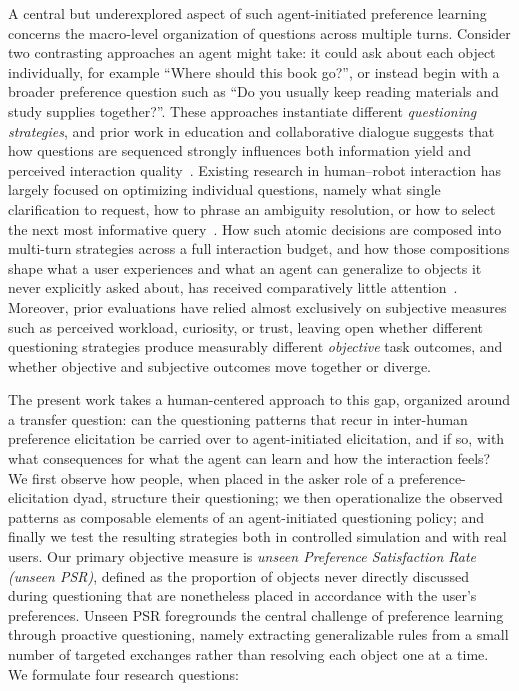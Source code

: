 \documentclass[manuscript,review,anonymous]{acmart}
\begin{document}
A central but underexplored aspect of such agent-initiated preference learning concerns the macro-level organization of questions across multiple turns. Consider two contrasting approaches an agent might take: it could ask about each object individually, for example ``Where should this book go?'', or instead begin with a broader preference question such as ``Do you usually keep reading materials and study supplies together?''. These approaches instantiate different \textit{questioning strategies}, and prior work in education and collaborative dialogue suggests that how questions are sequenced strongly influences both information yield and perceived interaction quality~\cite{cakmak2012designing,mutlu2009footing}. Existing research in human--robot interaction has largely focused on optimizing individual questions, namely what single clarification to request, how to phrase an ambiguity resolution, or how to select the next most informative query~\cite{cakmak2012designing,biyik2019asking,habibian2022here}. How such atomic decisions are composed into multi-turn strategies across a full interaction budget, and how those compositions shape what a user experiences and what an agent can generalize to objects it never explicitly asked about, has received comparatively little attention~\cite{tyshka2023interactive,hu2024designing}. Moreover, prior evaluations have relied almost exclusively on subjective measures such as perceived workload, curiosity, or trust, leaving open whether different questioning strategies produce measurably different \textit{objective} task outcomes, and whether objective and subjective outcomes move together or diverge.

The present work takes a human-centered approach to this gap, organized around a transfer question: can the questioning patterns that recur in inter-human preference elicitation be carried over to agent-initiated elicitation, and if so, with what consequences for what the agent can learn and how the interaction feels? We first observe how people, when placed in the asker role of a preference-elicitation dyad, structure their questioning; we then operationalize the observed patterns as composable elements of an agent-initiated questioning policy; and finally we test the resulting strategies both in controlled simulation and with real users. Our primary objective measure is \textit{unseen Preference Satisfaction Rate (unseen PSR)}, defined as the proportion of objects never directly discussed during questioning that are nonetheless placed in accordance with the user's preferences. Unseen PSR foregrounds the central challenge of preference learning through proactive questioning, namely extracting generalizable rules from a small number of targeted exchanges rather than resolving each object one at a time. We formulate four research questions:
\end{document}
